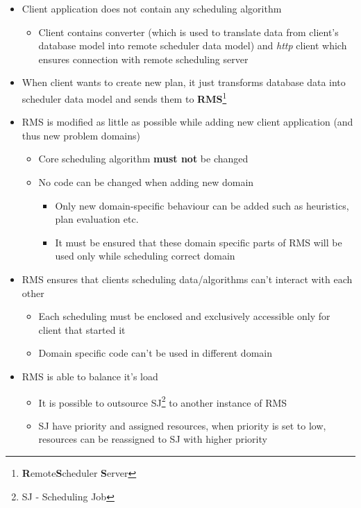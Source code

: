 \begin{itemize}
    \item  Client application does not contain any scheduling algorithm
    \begin{itemize}
        \item Client contains converter (which is used to translate data from client's database model into remote scheduler data model) and \textit{http} client which
        ensures connection with remote scheduling server
    \end{itemize}
    \item When client wants to create new plan, it just transforms database data into scheduler data model and sends them to
    \textbf{RMS}\footnote{\textbf{R}emote\textbf{S}cheduler \textbf{S}erver}
    \item RMS is modified as little as possible while adding new client application (and thus new problem domains)
    \begin{itemize}
        \item Core scheduling algorithm \textbf{must not} be changed
        \item No code can be changed when adding new domain
        \begin{itemize}
            \item Only new domain-specific behaviour can be added such as heuristics, plan evaluation etc.
            \item It must be ensured that these domain specific parts of RMS will be used only while scheduling correct domain
        \end{itemize}
    \end{itemize}
    \item RMS ensures that clients scheduling data/algorithms can't interact with each other
    \begin{itemize}
        \item Each scheduling must be enclosed and exclusively accessible only for client that started it
        \item Domain specific code can't be used in different domain
    \end{itemize}
    \item RMS is able to balance it's load
    \begin{itemize}
        \item It is possible to outsource SJ\footnote{SJ - Scheduling Job} to another instance of RMS
        \item SJ have priority and assigned resources, when priority is set to low, resources can be reassigned to SJ with higher priority

\end{itemize}
\end{itemize}
